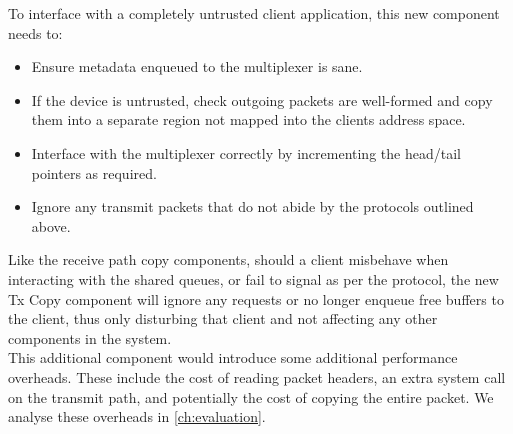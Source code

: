 To interface with a completely untrusted client application, this new component needs to:
\begin{itemize}
    \item Ensure metadata enqueued to the multiplexer is sane.
    \item If the device is untrusted, check outgoing packets are well-formed and copy them into a separate region not mapped
          into the clients address space.
    \item Interface with the multiplexer correctly by incrementing the head/tail pointers as required.
    \item Ignore any transmit packets that do not abide by the protocols outlined above.
\end{itemize}

Like the receive path copy components, should a client misbehave when interacting with the shared queues, or fail to signal as per
the protocol, the new Tx Copy component will ignore any requests or no longer enqueue free buffers to the client, thus only disturbing
that client and not affecting any other components in the system.\\
This additional component would introduce some additional performance overheads. These include the cost of reading packet headers, 
an extra system call on the transmit path, and potentially the cost of copying the entire packet. 
We analyse these overheads in \autoref{ch:evaluation}.\\
